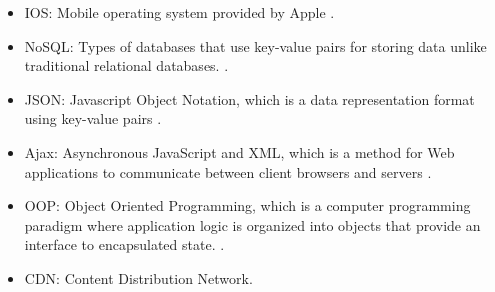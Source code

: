 \begin{itemize}
\item IOS: Mobile operating system provided by Apple \cite{IOS}.
\item NoSQL: Types of databases that use key-value pairs for storing data unlike traditional relational databases. \cite{NoSql}.
\item JSON: Javascript Object Notation, which is a data representation format using key-value pairs \cite{json}.
\item Ajax:  Asynchronous JavaScript and XML, which is a method for Web applications to communicate between client browsers and servers \cite{Ajax}.
\item OOP: Object Oriented Programming, which is a computer programming paradigm where application logic is organized into objects that provide an interface to encapsulated state. \cite{OOP}.
\item CDN: Content Distribution Network.
\end{itemize}


